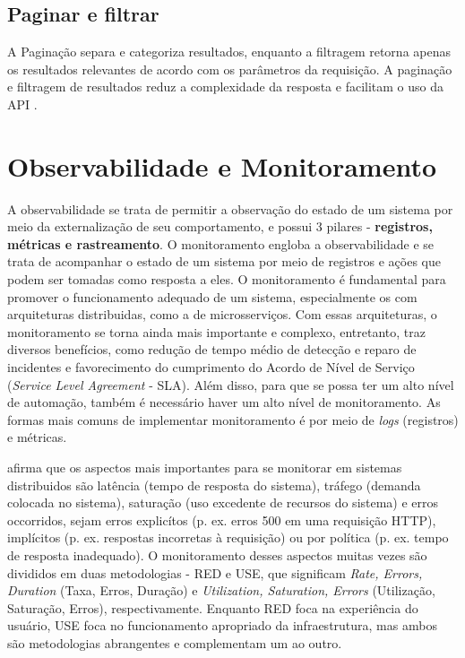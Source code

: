 \subsection{Paginar e filtrar}
A Paginação separa e categoriza resultados, enquanto a filtragem retorna apenas os resultados relevantes de acordo com os parâmetros da requisição. A paginação e filtragem de resultados reduz a complexidade da resposta e facilitam o uso da API \cite{rapidAPI-twitter}.


\section{Observabilidade e Monitoramento}\label{observabilidade-monitoramento}
A observabilidade se trata de permitir a observação do estado de um sistema por meio da externalização de seu comportamento, e possui 3 pilares - \textbf{registros, métricas e rastreamento}. O monitoramento engloba a observabilidade e se trata de acompanhar o estado de um sistema por meio de registros e ações que podem ser tomadas como resposta a eles. O monitoramento é fundamental para promover o funcionamento adequado de um sistema, especialmente os com arquiteturas distribuidas, como a de microsserviços. Com essas arquiteturas, o monitoramento se torna ainda mais importante e complexo, entretanto, traz diversos benefícios, como redução de tempo médio de detecção e reparo de incidentes e favorecimento do cumprimento do Acordo de Nível de Serviço (\emph{Service Level Agreement} - SLA). Além disso, para que se possa ter um alto nível de automação, também é necessário haver um alto nível de monitoramento. As formas mais comuns de implementar monitoramento é por meio de \emph{logs} (registros) e métricas.

 afirma que os aspectos mais importantes para se monitorar em sistemas distribuidos são latência (tempo de resposta do sistema), tráfego (demanda colocada no sistema), saturação (uso excedente de recursos do sistema) e erros occorridos, sejam erros explicítos (p. ex. erros 500 em uma requisição HTTP), implícitos (p. ex. respostas incorretas à requisição) ou por política (p. ex. tempo de resposta inadequado). O monitoramento desses aspectos muitas vezes são divididos em duas metodologias - RED e USE, que significam \emph{Rate, Errors, Duration} (Taxa, Erros, Duração) e \emph{Utilization, Saturation, Errors} (Utilização, Saturação, Erros), respectivamente. Enquanto RED foca na experiência do usuário, USE foca no funcionamento apropriado da infraestrutura, mas ambos são metodologias abrangentes e complementam um ao outro. \cite{livro-sre-google, grafana-blog}

